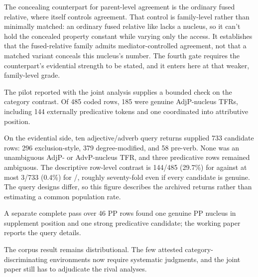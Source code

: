 The concealing counterpart for parent-level agreement is the ordinary fused relative, where  itself controls agreement. That control is family-level rather than minimally matched: an ordinary fused relative like  lacks a nucleus, so it can't hold the concealed property constant while varying only the access. It establishes that the fused-relative family admits mediator-controlled agreement, not that a matched variant conceals this nucleus's number. The fourth gate requires the counterpart's evidential strength to be stated, and it enters here at that weaker, family-level grade.

The pilot reported with the joint analysis supplies a bounded check on the category contrast. Of 485 coded  rows, 185 were genuine AdjP-nucleus TFRs, including 144 externally predicative tokens and one coordinated into attributive position.

On the evidential side, ten adjective/adverb query returns supplied 733 candidate rows: 296 exclusion-style, 379 degree-modified, and 58 pre-verb. None was an unambiguous AdjP- or AdvP-nucleus TFR, and three predicative rows remained ambiguous. The descriptive row-level contrast is 144/485 (29.7\%) for  against at most 3/733 (0.4\%) for /, roughly seventy-fold even if every candidate is genuine. The query designs differ, so this figure describes the archived returns rather than estimating a common population rate.

A separate complete pass over 46 PP rows found one genuine PP nucleus in supplement position and one strong predicative candidate; the working paper reports the query details.

The corpus result remains distributional. The few attested category-discriminating environments now require systematic judgments, and the joint paper still has to adjudicate the rival analyses.

